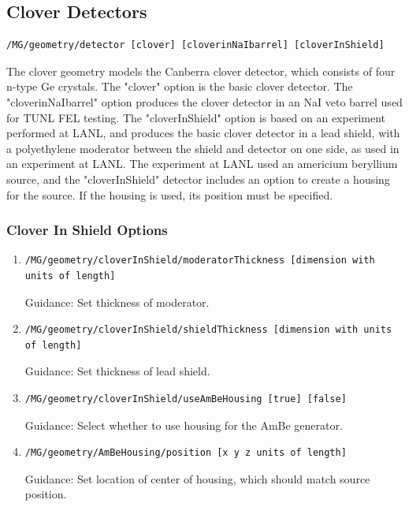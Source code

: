\subsection{Clover Detectors}
\begin{lstlisting}
/MG/geometry/detector [clover] [cloverinNaIbarrel] [cloverInShield]
\end{lstlisting}
The clover geometry models the Canberra clover detector, which  consists 
of four n-type Ge crystals. The "clover" option is the basic clover detector.
The "cloverinNaIbarrel" option produces the clover detector in an NaI veto 
barrel used for TUNL FEL testing.  The "cloverInShield" option is based on an 
experiment performed at LANL, and produces the basic clover detector in a lead 
shield, with a polyethylene moderator between the shield and detector on one 
side, as used in an experiment at LANL.  The experiment at LANL used an 
americium beryllium source, and the "cloverInShield" detector includes an 
option to create a housing for the source.  If the housing is used, its 
position must be specified.  

\subsubsection{Clover In Shield Options}
\begin{enumerate}
\item 
\begin{lstlisting}
/MG/geometry/cloverInShield/moderatorThickness [dimension with units of length] 
\end{lstlisting}
Guidance: Set thickness of moderator.
\item 
\begin{lstlisting}
/MG/geometry/cloverInShield/shieldThickness [dimension with units of length] 
\end{lstlisting}
Guidance: Set thickness of lead shield.
\item 
\begin{lstlisting}
/MG/geometry/cloverInShield/useAmBeHousing [true] [false] 
\end{lstlisting}
Guidance: Select whether to use housing for the AmBe generator.
\item 
\begin{lstlisting}
/MG/geometry/AmBeHousing/position [x y z units of length]
\end{lstlisting}
Guidance: Set location of center of housing, which should match source position.
\end{enumerate}

